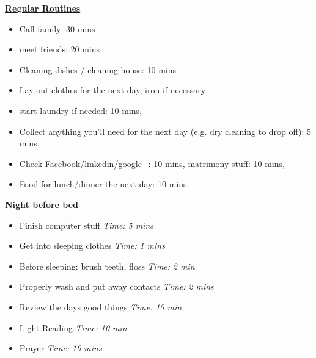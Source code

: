 \documentclass[serif, mathserif, final]{beamer}
\newcommand{\timeEst}[1]{\textit{Time:} \textit{#1}}
\begin{document}
\begin{frame}{}
\begin{columns}
\begin{column}{0.20\linewidth}
\begin{block}{\small \textbf{\underline{Regular Routines}} }
\begin{itemize}
\tiny \item \tiny Call family: 30 mins
\item \tiny meet friends: 20 mins
\item \tiny Cleaning dishes / cleaning house: 10 mins
\item \tiny Lay out clothes for the next day, iron if necessary
\item \tiny start laundry if needed: 10 mins,
\item \tiny Collect anything you’ll need for the next day (e.g. dry cleaning to drop off): 5 mins,
\item \tiny Check Facebook/linkedin/google+: 10 mins, matrimony stuff: 10 mins,
\item \tiny Food for lunch/dinner the next day: 10 mins
\end{itemize}

\underline{\textbf{Night before bed}}
\begin{itemize}
\tiny \item \tiny Finish computer stuff \timeEst{5 mins}
\item \tiny Get into sleeping clothes \timeEst{1 mins}
\item \tiny Before sleeping: brush teeth, floss \timeEst{ 2 min}
\item \tiny Properly wash and put away contacts \timeEst{ 2 mins}
\item \tiny Review the days good things \timeEst{ 10 min}
\item \tiny Light Reading \timeEst{ 10 min}
\item \tiny Prayer \timeEst{10 mins}
\end{itemize}
\end{block}

\end{column}%

\end{columns} 

\end{frame} 
\end{document}
